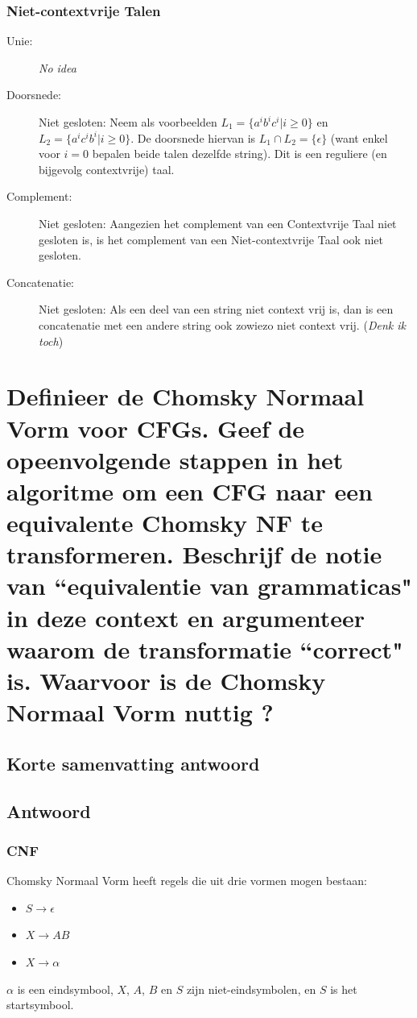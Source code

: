 \documentclass{article}
\begin{document}
        \subsubsection{Niet-contextvrije Talen}
            \begin{description}
                \item[Unie:] \textit{No idea}
                \item[Doorsnede:] Niet gesloten: Neem als voorbeelden $L_1 = \{a^i b^i c^i  \vert  i \geq 0\}$ en $L_2 = \{a^i c^i b^i  \vert  i \geq 0\}$. De doorsnede hiervan is $L_1 \cap L_2 = \{\epsilon\}$ (want enkel voor $i=0$ bepalen beide talen dezelfde string). Dit is een reguliere (en bijgevolg contextvrije) taal.
                \item[Complement:] Niet gesloten: Aangezien het complement van een Contextvrije Taal niet gesloten is, is het complement van een Niet-contextvrije Taal ook niet gesloten.
                \item[Concatenatie:] Niet gesloten: Als een deel van een string niet context vrij is, dan is een concatenatie met een andere string ook zowiezo niet context vrij. (\textit{Denk ik toch})
            \end{description}

\newpage
\section{Definieer de Chomsky Normaal Vorm voor CFGs. Geef de opeenvolgende stappen in het algoritme om een CFG naar een equivalente Chomsky NF te transformeren. Beschrijf de notie van ``equivalentie van grammaticas" in deze context en argumenteer waarom de transformatie ``correct" is. Waarvoor is de Chomsky Normaal Vorm nuttig ?}
    \subsection{Korte samenvatting antwoord}
        
    \subsection{Antwoord}
        \subsubsection{CNF}
            Chomsky Normaal Vorm heeft regels die uit drie vormen mogen bestaan:
            \begin{itemize}
                \item $S \rightarrow \epsilon$
                \item $X \rightarrow AB$
                \item $X \rightarrow \alpha$
            \end{itemize}
            $\alpha$ is een eindsymbool, $X$, $A$, $B$ en $S$ zijn niet-eindsymbolen, en $S$ is het startsymbool.
\end{document}
